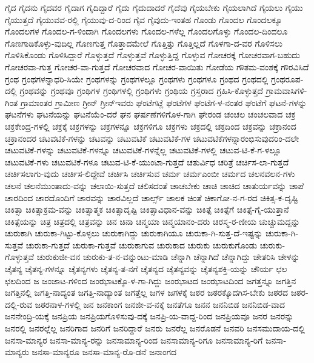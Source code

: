 {ಗೈದ
ಗೈದನು
ಗೈದವರ
ಗೈದಾಗ
ಗೈದಿದ್ದಾರೆ
ಗೈದು
ಗೈದುದಾದರೆ
ಗೈದೆವು
ಗೈಯಬೇಕು
ಗೈಯಲಾಗಿದೆ
ಗೈಯಲು
ಗೈಯು
ಗೈಯುತ್ತದೆ
ಗೈಯುವವ-ರಲ್ಲಿ
ಗೈಯುವು-ದ-ರಿಂದ
ಗೈವ
ಗೈವುದು-ಇಂತಹ
ಗೊಂಡು
ಗೊಂದಲ
ಗೊಂದಲಕ್ಕೂ
ಗೊಂದಲಗಳ
ಗೊಂದಲ-ಗ-ಳಿಂದಾಗಿ
ಗೊಂದಲಗಳು
ಗೊಂದಲ-ಗಳೆಲ್ಲ
ಗೊಂದಲಗೊಳ್ಳು
ಗೊಂದಲ-ದಿಂದಲೂ
ಗೊಣಗಾಡಿಕೊಳ್ಳು-ವುದಿಲ್ಲ
ಗೊಣಗುತ್ತ
ಗೊತ್ತಾದಮೇಲೆ
ಗೊತ್ತಿತ್ತು
ಗೊತ್ತಿಲ್ಲದೆ
ಗೊಳಗಾ-ದ-ವರ
ಗೊಳಿಸಲು
ಗೊಳಿಸಿಕೊಂಡು
ಗೊಳಿಸಿದ್ದಾರೆ
ಗೊಳ್ಳುತ್ತದೆ
ಗೊಳ್ಳುತ್ತವೆ
ಗೊಳ್ಳುತ್ತಿದ್ದ
ಗೊಳ್ಳುವ
ಗೋಚರಕ್ಕೆ
ಗೋಚರವಾಗ-ಬಹುದು
ಗೋಚರವಾ-ಗುತ್ತ
ಗೋಚರ-ವಾ-ಗುತ್ತದೆ
ಗೋಚರವಾದ
ಗೋಚರ-ವಾಯಿತು
ಗೋಡೆಯ
ಗೌತಮ-ವಂಶಕ್ಕೆ
ಗೌರವಿಸಿದೆ
ಗ್ರಂಥ
ಗ್ರಂಥಗಳನ್ನಾಧರಿ-ಸಿಯೇ
ಗ್ರಂಥಗಳನ್ನು
ಗ್ರಂಥಗಳಲ್ಲೂ
ಗ್ರಂಥಗಳು
ಗ್ರಂಥಗಳೂ
ಗ್ರಂಥದ
ಗ್ರಂಥದಲ್ಲಿ
ಗ್ರಂಥರೂಪ-ದಲ್ಲಿ
ಗ್ರಂಥವನ್ನು
ಗ್ರಂಥವೂ
ಗ್ರಂಥಿಗಳ
ಗ್ರಂಥಿಗಳಲ್ಲಿ
ಗ್ರಂಥಿಗಳು
ಗ್ರಂಥಿಯ
ಗ್ರಸ್ತರಾದ
ಗ್ರಹಿಸಿ-ಕೊಳ್ಳುತ್ತದೆ
ಗ್ರಾಮವಾಸಿಗಳಿ-ಗಿಂತ
ಗ್ರಾಮಾಂತರ
ಗ್ರಾಮೀಣ
ಗ್ರೀನ್
ಗ್ರೀನ್ಇವರು
ಘಂಟೆಗಟ್ಲೆ
ಘಂಟೆಗಳ
ಘಂಟೆಗ-ಳ-ನಂತರ
ಘಂಟೆಗೆ
ಘಟನೆ-ಗಳನ್ನು
ಘಟನೆಗಳು
ಘಟನೆಯನ್ನು
ಘಟನೆಯೆಂ-ದರೆ
ಘನ
ಘರ್ಷಣೆಗಳಿಗೊಳ-ಗಾಗಿ
ಘೇರಂಡ
ಚಂಚಲ
ಚಂಚಲವಾದ
ಚಕ್ರ
ಚಕ್ರಕೇಂದ್ರ-ಗಳಲ್ಲಿ
ಚಕ್ರಕ್ಕೆ
ಚಕ್ರಗಳನ್ನು
ಚಕ್ರಗಳನ್ನೂ
ಚಕ್ರಗಳಿಗೂ
ಚಕ್ರಗಳು
ಚಕ್ರದಲ್ಲಿ
ಚಕ್ರದಿಂದ
ಚಕ್ರವನ್ನು
ಚಕ್ರಾನಂದ
ಚಕ್ರಾನಂದರ
ಚಟವಟಿಕೆ-ಗಳನ್ನು
ಚಟವನ್ನು
ಚಟುವಟಿಕೆ
ಚಟುವಟಿಕೆ-ಗಳ
ಚಟುವಟಿಕೆಗಳನ್ನಾರಂಭಿಸುವುದರಿಂ-ದಲೇ
ಚಟುವಟಿಕೆ-ಗಳನ್ನು
ಚಟುವಟಿಕೆ-ಗಳನ್ನೂ
ಚಟುವಟಿಕೆ-ಗಳನ್ನೆಲ್ಲ
ಚಟುವಟಿಕೆ-ಗಳಲ್ಲಿ
ಚಟುವ-ಟಿ-ಕೆ-ಗ-ಳಲ್ಲೂ
ಚಟುವಟಿಕೆ-ಗಳು
ಚಟುವಟಿಕೆ-ಗಳೂ
ಚಟುವ-ಟಿ-ಕೆ-ಯುಂಟಾ-ಗುತ್ತದೆ
ಚತುರ್ವಿಧ
ಚರಿತ್ರೆ
ಚರ್ಚಿಸ-ಲಾ-ಗುತ್ತದೆ
ಚರ್ಚಿಸಲಾಗು-ವುದು
ಚರ್ಚಿಸ-ಲಿದ್ದೇವೆ
ಚರ್ಚಿಸಿ
ಚರ್ಚಿಸುವ
ಚರ್ಮ
ಚರ್ಮಎಂಬೀ
ಚರ್ಮದ
ಚಲನವಲನ-ಗಳು
ಚಲನೆ
ಚಲನೆಮುಂತಾದು-ವನ್ನು
ಚಲಾಯಿ-ಸುತ್ತದೆ
ಚಲಿಸದಂತೆ
ಚಾಚಬೇಕು
ಚಾಚಿ
ಚಾಚಿದ
ಚಾತುರ್ಯವನ್ನು
ಚಾಪೆ
ಚಾರದಿಂದ
ಚಾರದೊಂದಿಗೆ
ಚಾರವನ್ನು
ಚಾರವಿಲ್ಲದೆ
ಚಾರ್ಲ್ಸ್
ಚಾಲಕ
ಚಿಂತೆ
ಚಿಕಾಗೋ-ನ-ಗ-ರದ
ಚಿಕಿತ್ಸ-ಕ-ದೃಷ್ಟಿ
ಚಿಕಿತ್ಸಾ
ಚಿಕಿತ್ಸಾಕ್ರಮ-ವನ್ನು
ಚಿಕಿತ್ಸಾತ್ಮಕ
ಚಿಕಿತ್ಸಾದೃಷ್ಟಿ
ಚಿಕಿತ್ಸಾವಿಧಾನ-ವನ್ನು
ಚಿಕಿತ್ಸೆ
ಚಿಕಿತ್ಸೆಗೆ
ಚಿಕಿತ್ಸೆ-ಗೈ-ಯುತ್ತಾನೆ
ಚಿಕಿತ್ಸೆಯನ್ನು
ಚಿತ್ರ
ಚಿತ್ರದಲ್ಲಿ
ಚಿತ್ರವನ್ನು
ಚಿನ
ಚಿನಾ
ಚಿನ್ಮಯಾ
ಚಿನ್ಮಯಾನಂ-ದರು
ಚಿರಸ್ಮ-ರ-ಣೀಯ
ಚುಚ್ಚುಮದ್ದನ್ನು
ಚುರುಕಾಗಿ
ಚುರುಕಾ-ಗಿಟ್ಟು-ಕೊಳ್ಳಲು
ಚುರುಕಾಗಿದ್ದು
ಚುರುಕಾಗಿಯೂ
ಚುರುಕಾ-ಗಿ-ಸುತ್ತ-ದೆ-ಇಷ್ಟನ್ನು
ಚುರುಕಾ-ಗಿ-ಸುತ್ತವೆ
ಚುರುಕಾ-ಗುತ್ತದೆ
ಚುರುಕಾ-ಗುತ್ತವೆ
ಚುರುಕಾಗುವ
ಚುರುಕಾದ
ಚುರುಕು
ಚುರುಕುಗೊಂಡು
ಚುರುಕು-ಗೊಳ್ಳುತ್ತವೆ
ಚುರುಕುಜೀ-ವನ
ಚುರುಕು-ತ-ನ-ವನ್ನುಂಟು-ಮಾಡಿ
ಚೆನ್ನಾಗಿ
ಚೆನ್ನಾಗಿದೆ
ಚೆನ್ನಾಗಿದ್ದು
ಚೇತರಿಸಿ
ಚೇಳನ್ನು
ಚೈತನ್ಯ
ಚೈತನ್ಯ-ಗಳನ್ನೂ
ಚೈತನ್ಯಗಳು
ಚೈತನ್ಯ-ತ-ನಗೆ
ಚೈತನ್ಯದ
ಚೈತನ್ಯವನ್ನು
ಚೈತನ್ಯಶಕ್ತಿ-ಯನ್ನು
ಚೌರ್ಯ
ಛಲ
ಛಲದಿಂದ
ಜ
ಜಂಜಾಟ-ಗಳಿಂದ
ಜಂಝಾಟಕ್ಕೊ-ಳ-ಗಾ-ಗಿದ್ದು
ಜಂಝಾಟದ
ಜಂಝಾಟದಿಂದ
ಜಗತ್ತನ್ನೂ
ಜಗತ್ತಿನ
ಜಗತ್ತಿನಲ್ಲಿ
ಜಗತ್ತಿ-ನಾದ್ಯಂತ
ಜಗತ್ತಿ-ನಾದ್ಯಾಂತ
ಜಗತ್ತೆಲ್ಲ
ಜಗಳ
ಜಗಳಕ್ಕೆ
ಜಠರ
ಜಠರಕ್ಕೊದಗಿಸ-ಬೇಕು
ಜಠರದ
ಜಠರ-ದಲ್ಲಿ-ರುವ
ಜಠರನಾಳ-ಗಳಲ್ಲಿ
ಜನ
ಜನಕಾಂಗ
ಜನಜೀ-ವ-ನಕ್ಕೆ
ಜನತೆಗೂ
ಜನನ
ಜನನಿಬಿಡ
ಜನನಿಬಿಡ-ವಾದ
ಜನನೇಂದ್ರಿ-ಯಕ್ಕೆ
ಜನಪ್ರಿಯ
ಜನಪ್ರಿಯಗೊಳಿಸುವು-ದಕ್ಕೆ
ಜನಪ್ರಿ-ಯ-ವಾದ್ದ-ರಿಂದ
ಜನಪ್ರಿಯವೂ
ಜನರ
ಜನರನ್ನು
ಜನರಲ್ಲಿ
ಜನರಲ್ಲೆಲ್ಲ
ಜನರಿಗಾದ
ಜನರಿಗೆ
ಜನರಿದ್ದಾರೆ
ಜನರು
ಜನರೆಲ್ಲ
ಜನರೊಡನೆ
ಜನವರಿ
ಜನಸಮುದಾಯ-ದಲ್ಲಿ
ಜನಸಾ-ಮಾನ್ಯರ
ಜನಸಾ-ಮಾನ್ಯ-ರನ್ನು
ಜನಸಾಮಾನ್ಯ-ರಿಂದ
ಜನಸಾಮಾನ್ಯ-ರಿಗೂ
ಜನಸಾಮಾನ್ಯ-ರಿಗೆ
ಜನಸಾ-ಮಾನ್ಯರು
ಜನಸಾ-ಮಾನ್ಯರೂ
ಜನಸಾ-ಮಾನ್ಯ-ರೊ-ಡನೆ
ಜನಾಂಗದ
}
